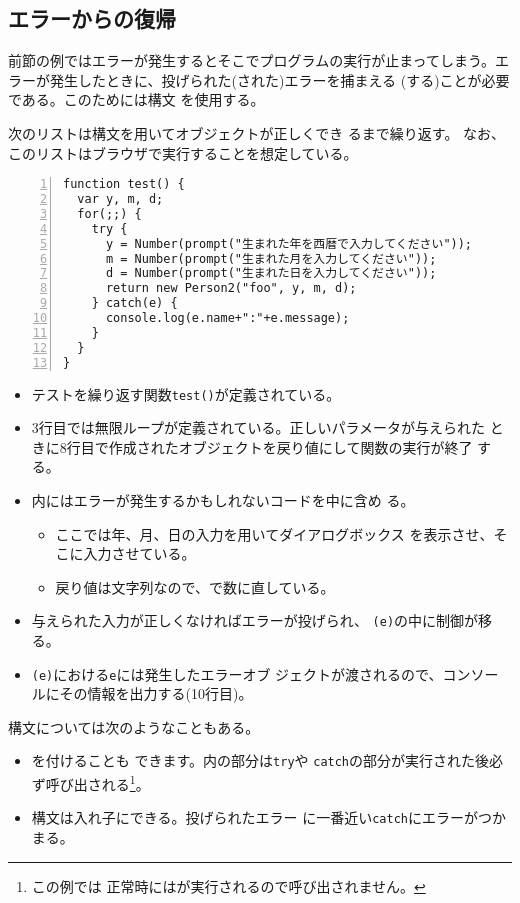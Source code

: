 \subsection{エラーからの復帰}
前節の例ではエラーが発生するとそこでプログラムの実行が止まってしまう。エ
ラーが発生したときに、投げられた(された)エラーを捕まえる
(する)ことが必要である。このためには構文
を使用する。
 \begin{Exec}\upshape
	次のリストは構文を用いてオブジェクトが正しくでき
	るまで繰り返す。
 なお、このリストはブラウザで実行することを想定している。
 \end{Exec}
\begin{Verbatim}[numbers=left]
function test() {
  var y, m, d;
  for(;;) {
    try {
      y = Number(prompt("生まれた年を西暦で入力してください"));
      m = Number(prompt("生まれた月を入力してください"));
      d = Number(prompt("生まれた日を入力してください"));
      return new Person2("foo", y, m, d);
    } catch(e) {
      console.log(e.name+":"+e.message);
    }
  }
}
\end{Verbatim}
\begin{itemize}
 \item テストを繰り返す関数\texttt{test()}が定義されている。
 \item 3行目では無限ループが定義されている。正しいパラメータが与えられた
			 ときに8行目で作成されたオブジェクトを戻り値にして関数の実行が終了
			 する。
 \item {}内にはエラーが発生するかもしれないコードを中に含め
			 る。
	\begin{itemize}
	 \item ここでは年、月、日の入力を用いてダイアログボックス
				 を表示させ、そこに入力させている。
	 \item 戻り値は文字列なので、で数に直している。
	\end{itemize}
 \item 与えられた入力が正しくなければエラーが投げられ、
			 \texttt{(e)}の中に制御が移る。
 \item {}\texttt{(e)}における\texttt{e}には発生したエラーオブ
			 ジェクトが渡されるので、コンソールにその情報を出力する(10行目)。
\end{itemize}
構文については次のようなこともある。
\begin{itemize}
 \item {}を付けることも
できます。内の部分は\texttt{try}や
\texttt{catch}の部分が実行された後必ず呼び出される\footnote{この例では
正常時にはが実行されるので呼び出されません。}。
 \item {}構文は入れ子にできる。投げられたエラー
			 に一番近い\texttt{catch}にエラーがつかまる。
\end{itemize}
